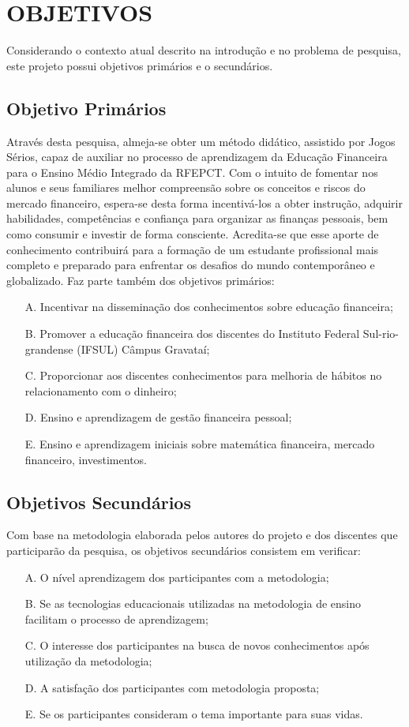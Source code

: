 \section{OBJETIVOS}
Considerando o contexto atual descrito na introdução e no problema de pesquisa, este projeto possui objetivos primários e o secundários.

\subsection{Objetivo Primários}
Através desta pesquisa, almeja-se obter um método didático, assistido por Jogos Sérios, capaz de auxiliar no processo de aprendizagem da Educação Financeira para o Ensino Médio Integrado da RFEPCT. Com o intuito de fomentar nos alunos e seus familiares melhor compreensão sobre os conceitos e riscos do mercado financeiro, espera-se desta forma incentivá-los a obter instrução, adquirir habilidades, competências e confiança para organizar as finanças pessoais, bem como consumir e investir de forma consciente. Acredita-se que esse aporte de conhecimento contribuirá para a formação de um estudante profissional mais completo e preparado para enfrentar os desafios do mundo contemporâneo e globalizado. Faz parte também dos objetivos primários:
\begin{enumerate}
    \item [A.] Incentivar na disseminação dos conhecimentos sobre educação financeira;
    \item [B.] Promover a educação financeira dos discentes do Instituto Federal Sul-rio-grandense (IFSUL) Câmpus Gravataí;
    \item [C.] Proporcionar aos discentes conhecimentos para melhoria de hábitos no relacionamento com o dinheiro;
    \item [D.] Ensino e aprendizagem de gestão financeira pessoal;
    \item [E.] Ensino e aprendizagem iniciais sobre matemática financeira, mercado financeiro, investimentos.
\end{enumerate}

\subsection{Objetivos Secundários}
Com base na metodologia elaborada pelos autores do projeto e dos discentes que participarão da pesquisa, os objetivos secundários consistem em verificar:
\begin{enumerate}
    \item [A.] O nível aprendizagem dos participantes com a metodologia;
    \item [B.] Se as tecnologias educacionais utilizadas na metodologia de ensino facilitam o processo de aprendizagem;
    \item [C.] O interesse dos participantes na busca de novos conhecimentos após utilização da metodologia;
    \item [D.] A satisfação dos participantes com metodologia proposta;
    \item [E.] Se os participantes consideram o tema importante para suas vidas.
\end{enumerate}

